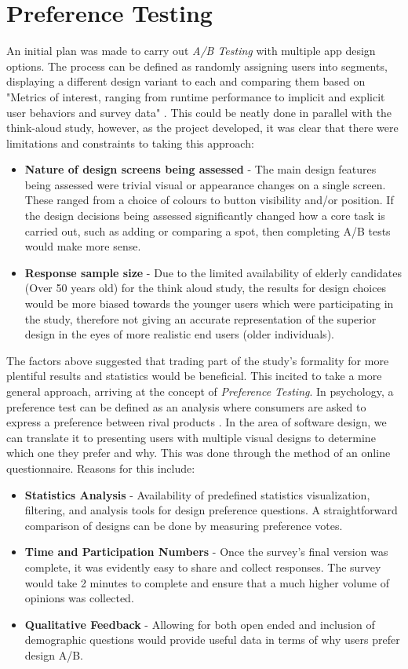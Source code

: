 \section{Preference Testing}
An initial plan was made to carry out \emph{A/B Testing} with multiple app design options. The process can be defined as randomly assigning users into segments, displaying a different design variant to each and comparing them based on "Metrics of interest, ranging from runtime performance to implicit and explicit user behaviors and survey data" \cite{kohavi2009controlled}. This could be neatly done in parallel with the think-aloud study, however, as the project developed, it was clear that there were limitations and constraints to taking this approach:
\begin{itemize}
    \item \textbf{Nature of design screens being assessed} - The main design features being assessed were trivial visual or appearance changes on a single screen. These ranged from a choice of colours to button visibility and/or position. If the design decisions being assessed significantly changed how a core task is carried out, such as adding or comparing a spot, then completing A/B tests would make more sense.
    \item \textbf{Response sample size} - Due to the limited availability of elderly candidates (Over 50 years old) for the think aloud study, the results for design choices would be more biased towards the younger users which were participating in the study, therefore not giving an accurate representation of the superior design in the eyes of more realistic end users (older individuals).
\end{itemize}
The factors above suggested that trading part of the study's formality for more plentiful results and statistics would be beneficial. This incited to take a more general approach, arriving at the concept of \emph{Preference Testing}. In psychology, a preference test can be defined as an analysis where consumers are asked to express a preference between rival products \cite{m.s._2015}. In the area of software design, we can translate it to presenting users with multiple visual designs to determine which one they prefer and why. This was done through the method of an online questionnaire. Reasons for this include:
\begin{itemize}
    \item \textbf{Statistics Analysis} - Availability of predefined statistics visualization, filtering, and analysis tools for design preference questions. A straightforward comparison of designs can be done by measuring preference votes. 
    \item \textbf{Time and Participation Numbers} - Once the survey's final version was complete, it was evidently easy to share and collect responses. The survey would take 2 minutes to complete and ensure that a much higher volume of opinions was collected.
    \item \textbf{Qualitative Feedback} - Allowing for both open ended and inclusion of demographic questions would provide useful data in terms of why users prefer design A/B.
\end{itemize}
